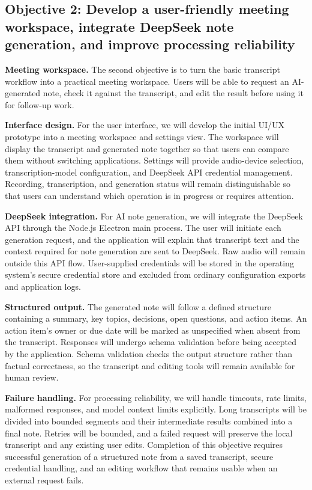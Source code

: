 \documentclass[12pt,a4paper]{article}
\begin{document}
\subsection*{Objective 2: Develop a user-friendly meeting workspace, integrate DeepSeek note generation, and improve processing reliability}
\textbf{Meeting workspace.} The second objective is to turn the basic transcript workflow into a practical meeting workspace. Users will be able to request an AI-generated note, check it against the transcript, and edit the result before using it for follow-up work.\par
\textbf{Interface design.} For the user interface, we will develop the initial UI/UX prototype into a meeting workspace and settings view. The workspace will display the transcript and generated note together so that users can compare them without switching applications. Settings will provide audio-device selection, transcription-model configuration, and DeepSeek API credential management. Recording, transcription, and generation status will remain distinguishable so that users can understand which operation is in progress or requires attention.\par
\textbf{DeepSeek integration.} For AI note generation, we will integrate the DeepSeek API through the Node.js Electron main process. The user will initiate each generation request, and the application will explain that transcript text and the context required for note generation are sent to DeepSeek. Raw audio will remain outside this API flow. User-supplied credentials will be stored in the operating system's secure credential store and excluded from ordinary configuration exports and application logs.\par
\textbf{Structured output.} The generated note will follow a defined structure containing a summary, key topics, decisions, open questions, and action items. An action item's owner or due date will be marked as unspecified when absent from the transcript. Responses will undergo schema validation before being accepted by the application. Schema validation checks the output structure rather than factual correctness, so the transcript and editing tools will remain available for human review.\par
\textbf{Failure handling.} For processing reliability, we will handle timeouts, rate limits, malformed responses, and model context limits explicitly. Long transcripts will be divided into bounded segments and their intermediate results combined into a final note. Retries will be bounded, and a failed request will preserve the local transcript and any existing user edits. Completion of this objective requires successful generation of a structured note from a saved transcript, secure credential handling, and an editing workflow that remains usable when an external request fails.\par
{}
\end{document}

